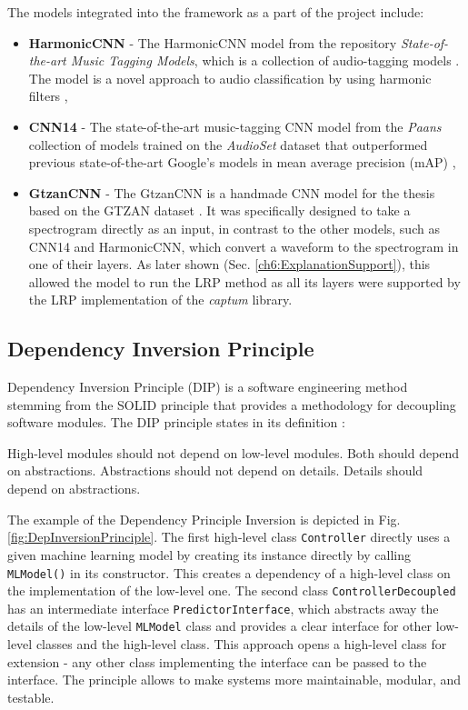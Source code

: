 \documentclass[
    bindingoffset=5mm,  %
    footnoteindent=3mm, %
    hyphenation=true    %
]{src/wut-thesis}
\begin{document}
The models integrated into the framework as a part of the project include:
\begin{itemize}
    \item \textbf{HarmonicCNN} -  The HarmonicCNN model from the repository
        \textit{State-of-the-art Music Tagging Models},
        which is a collection of audio-tagging models \cite{Won2020-ej}. The model is a
        novel approach to audio classification by using harmonic filters \cite{MinzWon2020},
    \item \textbf{CNN14} - The state-of-the-art music-tagging CNN model from the \emph{Paans} collection
        of models trained on the \emph{AudioSet} dataset \cite{AudioSet2017} that outperformed previous
        state-of-the-art Google’s models in mean average precision (mAP) \cite{Kong2019-wu},  
    \item \textbf{GtzanCNN} - The GtzanCNN is a handmade CNN model for the thesis based on the GTZAN dataset
        \cite{Sturm2013-ma}. It was specifically designed to take a spectrogram directly as an input,
        in contrast to the other models, such as CNN14 and HarmonicCNN, which convert a waveform to
        the spectrogram in one of their layers. As later shown (Sec. \ref{ch6:ExplanationSupport}), this
        allowed the model to run the LRP method as all its layers were supported by the LRP implementation
        of the \emph{captum} library.
\end{itemize}

\subsection{Dependency Inversion Principle} \label{ch2:DependencyInversion}

Dependency Inversion Principle (DIP) is a software engineering method stemming from
the SOLID principle that provides a methodology for decoupling software modules.
The DIP principle states in its definition \cite{martin2003agile}:

\begin{definition}
High-level modules should not depend on low-level modules. Both should depend on abstractions.
Abstractions should not depend on details. Details should depend on abstractions.
\end{definition}

The example of the Dependency Principle Inversion is depicted in Fig. \ref{fig:DepInversionPrinciple}.
The first high-level class \texttt{Controller} directly uses a given machine learning model by
creating its instance directly by calling \texttt{MLModel()} in its constructor.
This creates a dependency of a high-level class on the implementation of the low-level one.
The second class \texttt{ControllerDecoupled} has an intermediate interface \texttt{PredictorInterface},
which abstracts away the details of the low-level \texttt{MLModel} class and provides a clear interface for other
low-level classes and the high-level class. This approach opens a high-level class for extension - any other
class implementing the interface can be passed to the interface. The principle allows to make
systems more maintainable, modular, and testable.
\end{document}
